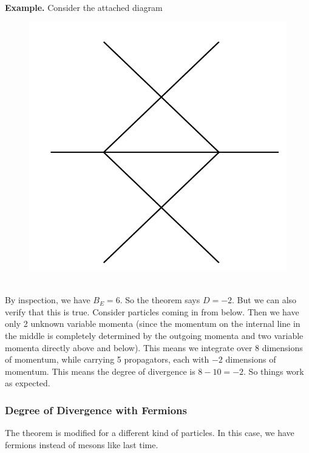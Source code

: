 \documentclass{book}
\theoremstyle{definition}
\begin{document}
\textbf{Example.} Consider the attached diagram
\begin{figure}[!htb]
	\centering
	\includegraphics[scale=0.3]{div-count}
\end{figure}\\


By inspection, we have $B_E = 6$. So the theorem says $D = -2$. But we can also verify that this is true. Consider particles coming in from below. Then we have only 2 unknown variable momenta (since the momentum on the internal line in the middle is completely determined by the outgoing momenta and two variable momenta directly above and below). This means we integrate over 8 dimensions of momentum, while carrying 5 propagators, each with $-2$ dimensions of momentum. This means the degree of divergence is $8 - 10 = -2$. So things work as expected.






\subsubsection{Degree of Divergence with Fermions}



The theorem is modified for a different kind of particles. In this case, we have fermions instead of mesons like last time. \\
\end{document}

